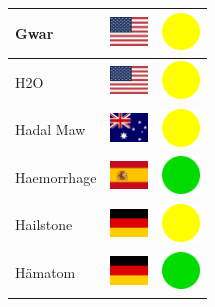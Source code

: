 \documentclass[12pt, a4paper, twoside]{report}
\begin{document}
\begin{center}
\begin{longtable}{|p{5cm}|p{2cm}|p{2cm}|}
 Gwar                                                       & \includegraphics[width=1cm]{../4x3/us} &   \includegraphics[width=1cm]{../likes/m} \\ \hline
 H2O                                                        & \includegraphics[width=1cm]{../4x3/us} &   \includegraphics[width=1cm]{../likes/m} \\ \hline
 Hadal Maw                                                  & \includegraphics[width=1cm]{../4x3/au} &   \includegraphics[width=1cm]{../likes/m} \\ \hline
 Haemorrhage                                                & \includegraphics[width=1cm]{../4x3/es} &   \includegraphics[width=1cm]{../likes/y} \\ \hline
 Hailstone                                                  & \includegraphics[width=1cm]{../4x3/de} &   \includegraphics[width=1cm]{../likes/m} \\ \hline
 Hämatom                                                    & \includegraphics[width=1cm]{../4x3/de} &   \includegraphics[width=1cm]{../likes/y} \\ \hline

\end{longtable}
\end{center}
\end{document}
